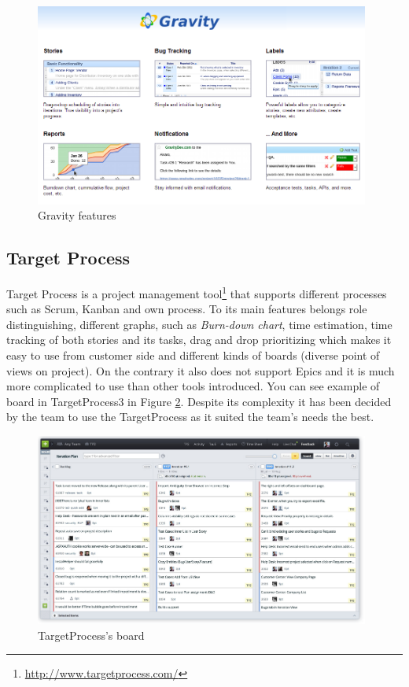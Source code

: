 \begin{figure}[!h]
	\centering
		\includegraphics[width=11cm]{preliminaryStudies/gravity.png}
	\caption{Gravity features}
	\label{fig:gravity}
\end{figure}

\subsection{Target Process} 
\label{subsec:targetProcessToolDescription}
Target Process is a project management tool\footnote{\url{http://www.targetprocess.com/}} that supports different processes such as Scrum, Kanban and own process. 
To its main features belongs role distinguishing, different graphs, such as \emph{Burn-down chart}, time estimation, time tracking of both stories and its tasks, drag and drop prioritizing which makes it easy to use from customer side and different kinds of boards (diverse point of views on project).
On the contrary it also does not support Epics and it is much more complicated to use than other tools introduced.
You can see example of board in TargetProcess3 in Figure \ref{fig:targetp}. Despite its complexity it has been decided by the team to use the TargetProcess as it suited the team's needs the best.

\begin{figure}[!h]
	\centering
		\includegraphics[width=11cm]{preliminaryStudies/targetp.png}
	\caption{TargetProcess's board}
	\label{fig:targetp}
\end{figure}

